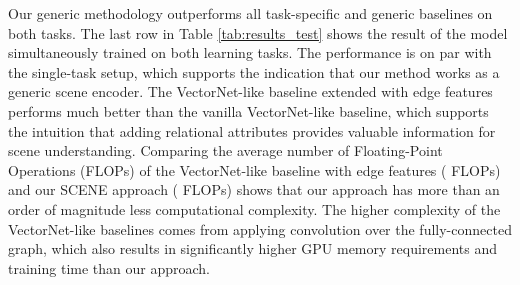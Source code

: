 \documentclass[letterpaper, 10 pt, journal, twoside]{IEEEtran}
\begin{document}
Our generic methodology outperforms all task-specific and generic baselines on both tasks.
The last row in Table \ref{tab:results_test} shows the result of the model simultaneously trained on both learning tasks.
The performance is on par with the single-task setup, which supports the indication that our method works as a generic scene encoder.
The VectorNet-like baseline extended with edge features performs much better than the vanilla VectorNet-like baseline, which supports the intuition that adding relational attributes provides valuable information for scene understanding.
Comparing the average number of Floating-Point Operations (FLOPs) of the VectorNet-like baseline with edge features ( FLOPs) and our SCENE approach ( FLOPs) shows that our approach has more than an order of magnitude less computational complexity.
The higher complexity of the VectorNet-like baselines comes from applying convolution over the fully-connected graph, which also results in significantly higher GPU memory requirements and training time than our approach.
\end{document}
